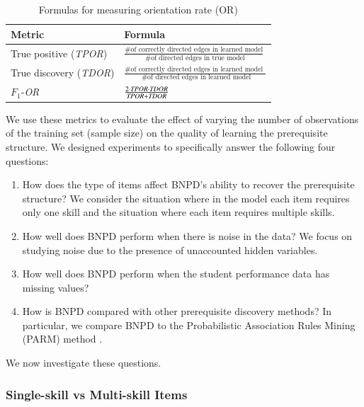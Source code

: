 \documentclass{edm_template}
\begin{document}
{	
	\begin{table}[th]
		\centering
		\caption{Formulas for measuring orientation rate (OR) \label{tbl:or}}
		\label{my-label}
		\begin{tabular}{@{}ll@{}}
			\toprule
			Metric & Formula \\ \midrule
			True positive  (\emph{TPOR}) & $\frac{ \text{\# of correctly directed edges in learned model} } {\text{ \# of directed edges in true model}}$  \\
			True discovery   (\emph{TDOR})& $\frac{ \text{\# of correctly directed edges in learned model } }{\text{ \# of directed edges in learned model}} $\\
			$F_1$-\textit{OR} &  $\frac{  2\cdot \text{\emph{TPOR}} \cdot \text{\emph{TDOR}} }{\text{\emph{TPOR}}+\text{\emph{TDOR}}}$ \\
			\bottomrule
		\end{tabular}
	\end{table}
	
	We use these metrics to evaluate the effect of varying the  number of observations  of the training set (sample size) on the quality of learning the prerequisite structure.
	We designed experiments to specifically answer the following four questions:
	\begin{enumerate}[noitemsep,topsep=2pt,parsep=0pt,partopsep=0pt]
		\item How does the type of items affect BNPD's ability to recover the prerequisite structure?
		We consider the situation where in the model each item requires only one skill and the situation where each item requires multiple skills. 
		\item How well does BNPD perform when there is noise in the data?
		We focus on studying noise due to the presence of unaccounted hidden variables.
		\item How well does BNPD perform when the student performance data has missing values?
		\item How is BNPD compared with other prerequisite discovery methods?
		In particular, we compare BNPD to the Probabilistic Association Rules Mining (PARM) method \cite{chen2015discovering}.
	\end{enumerate}
	We now investigate these questions.


	\subsubsection{Single-skill vs Multi-skill Items}
	
}
\end{document}
